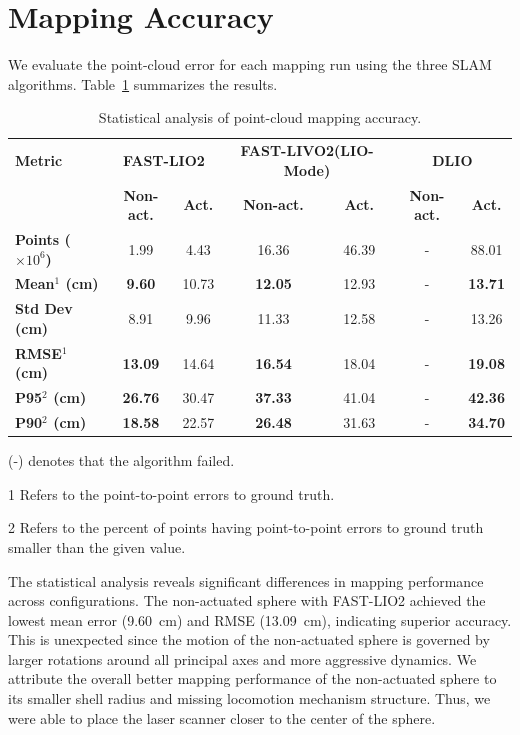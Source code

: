 \documentclass[english, bachelor, utf8]{base/thesis_telematics}
\begin{document}
\section{Mapping Accuracy}
We evaluate the point-cloud error for each mapping run using the three SLAM algorithms. 
Table~\ref{tab:point_cloud_error} summarizes the results.
\begin{table}
\centering
\begin{threeparttable}
\caption{Statistical analysis of point-cloud mapping accuracy.}
\label{tab:point_cloud_error}
\begin{tabular}{l|cc|cc|cc}
\toprule
\textbf{Metric} & \multicolumn{2}{c|}{\textbf{FAST-LIO2}} & \multicolumn{2}{c|}{\textbf{FAST-LIVO2(LIO-Mode)}} & \multicolumn{2}{c}{\textbf{DLIO}} \\
& \textbf{Non-act.} & \textbf{Act.} & \textbf{Non-act.} & \textbf{Act.} & \textbf{Non-act.} & \textbf{Act.} \\
\midrule
\textbf{Points ($\times 10^6$)} & 1.99 & 4.43 & 16.36 & 46.39 & - & 88.01 \\
\textbf{Mean$^1$ (cm)} & \bf{9.60} & 10.73 & \bf{12.05} & 12.93 & - & \bf{13.71} \\
\textbf{Std Dev (cm)} & 8.91 & 9.96 & 11.33 & 12.58 & - & 13.26 \\
\textbf{RMSE$^1$ (cm)} & \bf{13.09} & 14.64 & \bf{16.54} & 18.04 & - & \bf{19.08} \\
\textbf{P95$^2$ (cm)} & \bf{26.76} & 30.47 & \bf{37.33} & 41.04 & - & \bf{42.36} \\
\textbf{P90$^2$ (cm)} & \bf{18.58} & 22.57 & \bf{26.48} & 31.63 & - & \bf{34.70} \\
\bottomrule
\end{tabular}
\begin{tablenotes}
    \item (-) denotes that the algorithm failed.
    \item[1] Refers to the point-to-point errors to ground truth.
    \item[2] Refers to the percent of points having point-to-point errors to ground truth smaller than the given value. 
\end{tablenotes}
\end{threeparttable}
\end{table}
The statistical analysis reveals significant differences in mapping performance across configurations. 
The non-actuated sphere with FAST-LIO2 achieved the lowest mean error (\SI{9.60}{\centi\meter}) and RMSE (\SI{13.09}{\centi\meter}), indicating superior accuracy. 
This is unexpected since the motion of the non-actuated sphere is governed by larger rotations around all principal axes and more aggressive dynamics.
We attribute the overall better mapping performance of the non-actuated sphere to its smaller shell radius and missing locomotion mechanism structure.
Thus, we were able to place the laser scanner closer to the center of the sphere.
\end{document}
